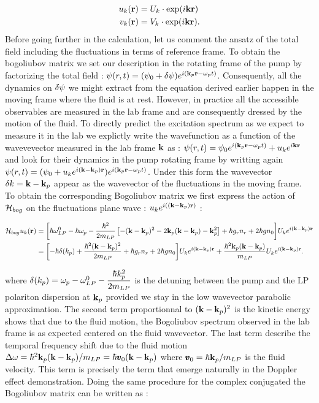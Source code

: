 \begin{subequations}
    \begin{align}
        u_k(\mathbf{r})&=U_k\cdot\mathrm{exp}(i\mathbf{k}\mathbf{r}) \\
        v_k(\mathbf{r})&=V_k \cdot\mathrm{exp}(i\mathbf{k}\mathbf{r}).
    \end{align}
\end{subequations}
Before going further in the calculation, let us comment the ansatz of the total field including the fluctuations in terms of reference frame. To obtain the bogoliubov matrix 
we set our description in the rotating frame of the pump by factorizing the total field : $\psi(r,t)=(\psi_0+\delta\psi)e^{i(\mathbf{k}_p\mathbf{r}-\omega_pt)}$. Consequently, all the dynamics on $\delta\psi$ we might extract from the equation derived earlier
happen in the moving frame where the fluid is at rest. However, in practice all the accessible observables are measured in the lab frame and are consequently dressed by the motion of the fluid. To directly predict the excitation spectrum as we expect to measure it in the lab
we explictly write the wavefunction as a function of the wavevevector measured in the lab frame $\mathbf{k}$ as : $\psi(r,t)=\psi_0e^{i(\mathbf{k}_p\mathbf{r}-\omega_pt)}+ u_k e^{i\mathbf{k}\mathbf{r}}$ and look for their dynamics in the pump rotating frame by writting again $\psi(r,t)=(\psi_0+u_ke^{i(\mathbf{k}-\mathbf{k}_p)\mathbf{r}})e^{i(\mathbf{k}_p\mathbf{r}-\omega_pt)}$. Under this form
the wavevector $\delta k=\mathbf{k}-\mathbf{k}_p$ appear as the wavevector of the fluctuations in the moving frame. 
To obtain the corresponding Bogoliubov matrix we first express the action of $\mathcal{H}_{bog}$ on the fluctuations plane wave : $u_ke^{i((\mathbf{k}-\mathbf{k}_p)\mathbf{r})}$ :

\begin{equation}
    \begin{align}
    \mathcal{H}_{bog}u_k(\mathbf{r}) &= \biggl[\hbar\omega_{LP}^0 - \hbar \omega_p-\dfrac{\hbar^2}{2m_{LP}}\left[-(\mathbf{k}-\mathbf{k}_p)^2 -2\mathbf{k}_p(\mathbf{k}-\mathbf{k}_p)-\mathbf{k}_p^2\right]+\hbar g_rn_r + 2\hbar g n_0 \biggr]U_ke^{i(\mathbf{k}-\mathbf{k}_p)\mathbf{r}} \\
            &= \biggl[-\hbar\delta(k_p)+\dfrac{\hbar^2(\mathbf{k}-\mathbf{k}_p)^2}{2m_{LP}}+\hbar g_rn_r + 2\hbar g n_0\biggr]U_ke^{i(\mathbf{k}-\mathbf{k}_p)\mathbf{r}} + \dfrac{\hbar^2\mathbf{k}_p(\mathbf{k}-\mathbf{k}_p)}{m_{LP}}U_ke^{i(\mathbf{k}-\mathbf{k}_p)\mathbf{r}}.
    \end{align}
    \label{eq:ham_bog_plane_wave}
\end{equation}

where $\delta(k_p)=\omega_p - \omega_{LP}^0 - \dfrac{\hbar k_p^2}{2m_{LP}}$ is the detuning between the pump and the LP polariton dispersion at $\mathbf{k}_p$ provided we stay in the low wavevector
parabolic approximation. The second term proportionnal to $(\mathbf{k}-\mathbf{k}_p)^2$ is the kinetic energy shows that due to the fluid motion, the Bogoliubov spectrum observed in the lab frame is as expected
centered on the fluid wavevector. The last term describe the temporal frequency shift due to the fluid motion  $\Delta\omega =\hbar^2\mathbf{k}_p(\mathbf{k}-\mathbf{k}_p)/m_{LP}=\hbar\pmb{v}_0(\mathbf{k}-\mathbf{k}_p)$ where $\pmb{v}_0=\hbar\mathbf{k}_p/m_{LP}$ is the fluid velocity. This term is precisely
the term that emerge naturally in the Doppler effect demonstration.
Doing the same procedure for the complex conjugated the Bogoliubov matrix can be written as :



